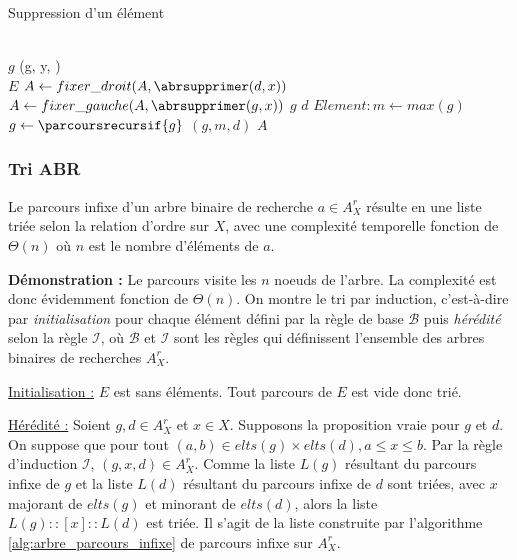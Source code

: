 \documentclass[../../../main.tex]{subfiles}
\begin{document}
\begin{algorithm}
\caption{Suppression d'un élément \label{alg:suppression_abr}}
\Indm\nonl{} \\
\Indp
{} {
	\Return $g$
}
 {
	\Return (g, y, )
}
\Indm\nonl{} \\
\Indp
{} {
	 {
		\Return $E$ 
	}
	 {
		 {
			$A\leftarrow fixer\_droit(A, \abrsupprimer(d, x))$\;
		}
		 {
			$A\leftarrow fixer\_gauche(A, \abrsupprimer(g, x))$\;
		}
		 {
			 {
				\Return $g$
			}
			 {
				\Return $d$
			}
			$Element:m\leftarrow max(g)$\;
			$g\leftarrow \parcoursrecursif{g}$\;
			\Return $(g, m, d)$
		}
		\Return $A$
	}
}
\end{algorithm}
\subsubsection{Tri ABR}
 Le parcours infixe d'un arbre binaire de recherche $a\in A^r_X$ résulte en une liste triée selon la relation d'ordre sur $X$, avec une complexité temporelle fonction de $\Theta(n)$ où $n$ est le nombre d'éléments de $a$.

\textbf{Démonstration :} Le parcours visite les $n$ noeuds de l'arbre. La complexité est donc évidemment fonction de $\Theta(n)$. On montre le tri par induction, c'est-à-dire par \textit{initialisation} pour chaque élément défini par la règle de base $\mathcal{B}$ puis \textit{hérédité} selon la règle $\mathcal{I}$, où $\mathcal{B}$ et $\mathcal{I}$ sont les règles qui définissent l'ensemble des arbres binaires de recherches $A^r_X$.

\underline{Initialisation :} $E$ est sans éléments. Tout parcours de $E$ est vide donc trié.

\underline{Hérédité :} Soient $g, d\in A^r_X$ et $x\in X$. Supposons la proposition vraie pour $g$ et $d$. On suppose que pour tout $(a, b)\in elts(g)\times elts(d), a \leq x\leq b$. Par la règle d'induction $\mathcal{I}$, $(g, x, d)\in A^r_X$. Comme la liste $L(g)$ résultant du parcours infixe de $g$ et la liste $L(d)$ résultant du parcours infixe de $d$ sont triées, avec $x$ majorant de $elts(g)$ et minorant de $elts(d)$, alors la liste $L(g)::[x]::L(d)$ est triée. Il s'agit de la liste construite par l'algorithme \ref{alg:arbre_parcours_infixe} de parcours infixe sur $A^r_X$.
\end{document}
